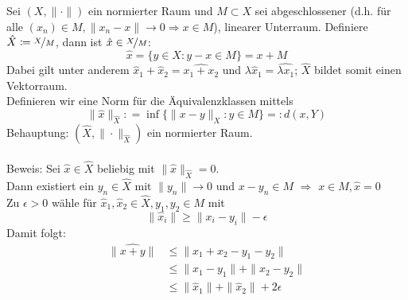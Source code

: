 \begin{definition} \label{def:2.15-Quotientenraeume}
	Sei $(X, \| \cdot \|)$ ein normierter Raum und $M \subset X$ sei abgeschlossener (d.h. für alle $(x_{n}) \in M, \| x_{n} - x \| \rightarrow 0 \Rightarrow x \in M$), linearer Unterraum.
	Definiere $\hat X \coloneqq \nicefrac{X}{M}$, dann ist $\hat x \in \nicefrac{X}{M}$:
		\[ \hat x = \{ y \in X: y - x \in M \} = x + M \]
	Dabei gilt unter anderem $\hat x_{1} + \hat x_{2} = \widehat{x_{1} + x_{2}}$ und $\lambda \hat x_{1} = \widehat{\lambda x_{1}}$; $\hat X$ bildet somit einen Vektorraum. \\
	Definieren wir eine Norm für die Äquivalenzklassen mittels
		\[ \| \hat x \|_{\hat X} : = \inf \{ \| x - y \|_{X}: y \in M \} =: d(x, Y) \]
	Behauptung: $(\hat X, \| \cdot \|_{\hat X})$ ein normierter Raum. \\ \\
	Beweis: Sei $\hat x \in \hat X$ beliebig mit $\| \hat x \|_{\hat X} = 0$. \\
	Dann existiert ein $y_{n} \in \hat X \text{ mit } \| y_{n} \| \rightarrow 0$ und $x - y_{n} \in M$ $\Rightarrow$ $x \in M, \hat x = 0 $ \\
	Zu $\epsilon > 0$ wähle für $\hat x_{1}, \hat x_{2} \in \hat X, y_{1}, y_{2} \in M$ mit
	\[ \| \hat x_{i} \| \geq \| x_{i} - y_{i} \| - \epsilon \] 
	Damit folgt:
	\begin{align*}
		\| \widehat{x + y} \| & \leq \| x_{1} + x_{2} - y_{1} - y_{2} \| \\
						  & \leq \| x_{1} - y_{1} \| + \| x_{2} - y_{2} \| \\
						  & \leq \| \hat x_{1} \| + \| \hat x_{2} \| + 2 \epsilon
	\end{align*}
\end{definition}


